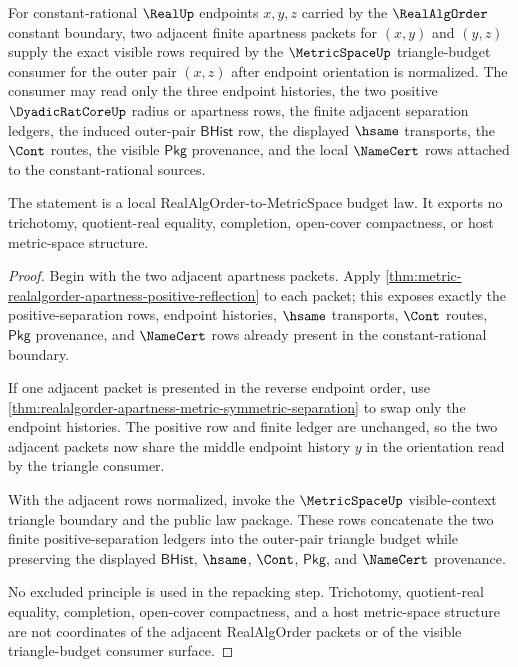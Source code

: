 \begin{theorem}
\label{thm:metric-realalgorder-apartness-triangle-budget}
For constant-rational $\RealUp$ endpoints $x,y,z$ carried by the
$\RealAlgOrder$ constant boundary, two adjacent finite apartness packets for
$(x,y)$ and $(y,z)$ supply the exact visible rows required by the
$\MetricSpaceUp$ triangle-budget consumer for the outer pair $(x,z)$ after
endpoint orientation is normalized. The consumer may read only the three
endpoint histories, the two positive $\DyadicRatCoreUp$ radius or apartness
rows, the finite adjacent separation ledgers, the induced outer-pair
$\mathsf{BHist}$ row, the displayed $\hsame$ transports, the $\Cont$ routes,
the visible $\mathsf{Pkg}$ provenance, and the local $\NameCert$ rows attached
to the constant-rational sources.

The statement is a local RealAlgOrder-to-MetricSpace budget law. It exports no
trichotomy, quotient-real equality, completion, open-cover compactness, or
host metric-space structure.
\end{theorem}
\begin{proof}
Begin with the two adjacent apartness packets. Apply
\autoref{thm:metric-realalgorder-apartness-positive-reflection} to each packet;
this exposes exactly the positive-separation rows, endpoint histories,
$\hsame$ transports, $\Cont$ routes, $\mathsf{Pkg}$ provenance, and
$\NameCert$ rows already present in the constant-rational boundary.

If one adjacent packet is presented in the reverse endpoint order, use
\autoref{thm:realalgorder-apartness-metric-symmetric-separation} to swap only
the endpoint histories. The positive row and finite ledger are unchanged, so
the two adjacent packets now share the middle endpoint history $y$ in the
orientation read by the triangle consumer.

With the adjacent rows normalized, invoke the $\MetricSpaceUp$ visible-context
triangle boundary and the public law package. These rows concatenate the two
finite positive-separation ledgers into the outer-pair triangle budget while
preserving the displayed $\mathsf{BHist}$, $\hsame$, $\Cont$, $\mathsf{Pkg}$,
and $\NameCert$ provenance.

No excluded principle is used in the repacking step. Trichotomy, quotient-real
equality, completion, open-cover compactness, and a host metric-space structure
are not coordinates of the adjacent RealAlgOrder packets or of the visible
triangle-budget consumer surface.
\end{proof}

